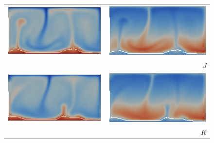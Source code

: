 \begin{figure}
\begin{tabular}{cr}
    \includegraphics[width=\twofigs]{chapters/vynnytska/png/tmJ.png} &
    \includegraphics[width=\twofigs]{chapters/vynnytska/png/visJ.png} \\& $J$ \\
    \includegraphics[width=\twofigs]{chapters/vynnytska/png/tmK.png} &
    \includegraphics[width=\twofigs]{chapters/vynnytska/png/visK.png} \\& $K$ \\

\end{tabular}
\end{figure}
